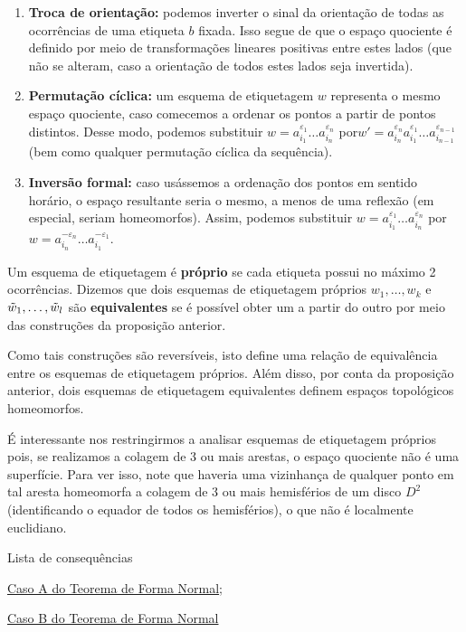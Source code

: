 \begin{prop}
\begin{enumerate}
        \item \textbf{Troca de orientação:} podemos inverter o sinal da orientação de todas as ocorrências de uma etiqueta $b$ fixada. Isso segue de que o espaço quociente é definido por meio de transformações lineares positivas entre estes lados (que não se alteram, caso a orientação de todos estes lados seja invertida).
        
        \item \textbf{Permutação cíclica:} um esquema de etiquetagem $w$ representa o mesmo espaço quociente, caso comecemos a ordenar os pontos a partir de pontos distintos. Desse modo, podemos substituir $w = a_{i_1}^{\varepsilon_1} \ldots a_{i_n}^{\varepsilon_n}$ por\break $w' = a_{i_n}^{\varepsilon_n} a_{i_1}^{\varepsilon_1} \ldots a_{i_{n-1}}^{\varepsilon_{n-1}}$ (bem como qualquer permutação cíclica da sequência).
    
        \item \textbf{Inversão formal:} caso usássemos a ordenação dos pontos em sentido horário, o espaço resultante seria o mesmo, a menos de uma reflexão (em especial, seriam homeomorfos). Assim, podemos substituir $w = a_{i_1}^{\varepsilon_1} \ldots a_{i_n}^{\varepsilon_n}$ por $w = a_{i_n}^{-\varepsilon_n} \ldots a_{i_1}^{-\varepsilon_1}$.
    \end{enumerate}
\end{prop}

\begin{defi}
    Um esquema de etiquetagem é \textbf{próprio} se cada etiqueta possui no máximo 2 ocorrências. Dizemos que dois esquemas de etiquetagem próprios $w_1,\ldots,w_k$ e $\Tilde{w}_1,\ldots,\Tilde{w}_l$ são \textbf{equivalentes} se é possível obter um a partir do outro por meio das construções da proposição anterior.
\end{defi}

Como tais construções são reversíveis, isto define uma relação de equivalência entre os esquemas de etiquetagem próprios. Além disso, por conta da proposição anterior, dois esquemas de etiquetagem equivalentes definem espaços topológicos homeomorfos.

É interessante nos restringirmos a analisar esquemas de etiquetagem próprios pois, se realizamos a colagem de 3 ou mais arestas, o espaço quociente não é uma superfície. Para ver isso, note que haveria uma vizinhança de qualquer ponto em tal aresta homeomorfa a colagem de 3 ou mais hemisférios de um disco $D^2$ (identificando o equador de todos os hemisférios), o que não é localmente euclidiano.

\begin{titlemize}{Lista de consequências}
	\item \hyperref[forma-normal-caso-a-thm]{Caso A do Teorema de Forma Normal};\\
	\item \hyperref[forma-normal-caso-b-thm]{Caso B do Teorema de Forma Normal}
\end{titlemize}
